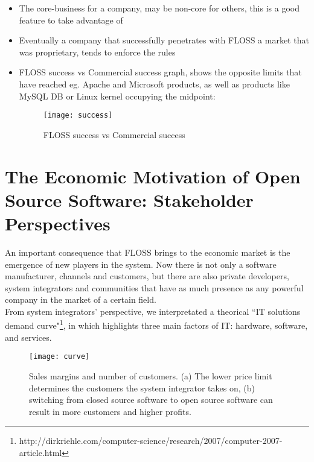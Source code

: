 \begin{itemize}
\item The core-business for a company, may be non-core for others, this is a good feature to take advantage of
\item Eventually a company that successfully penetrates with FLOSS a market that was proprietary, tends to enforce the rules
\item FLOSS success vs Commercial success graph, shows the opposite limits that have reached eg. Apache and Microsoft products, as well as products like MySQL DB or Linux kernel occupying the midpoint:
\begin{figure}[h]
\begin{center}
\texttt{[image: success]}
\caption{FLOSS success vs Commercial success}
\label{fig:success}
\end{center}
\end{figure}
\end{itemize}


\section{The Economic Motivation of Open Source Software: Stakeholder Perspectives}\label{Section 2.2}

An important consequence that FLOSS brings to the economic market is the emergence of new players in the system. Now there is not only a software manufacturer, channels and customers, but there are also private developers, system integrators and communities that have as much presence as any powerful company in the market of a certain field.\\

From system integrators' perspective, we interpretated a theorical \textquotedblleft IT solutions demand curve"\footnote{http://dirkriehle.com/computer-science/research/2007/computer-2007-article.html}, in which highlights three main factors of IT: hardware, software, and services.\\

\begin{figure}[h]
\begin{center}
\texttt{[image: curve]}
\caption[Sales margins and number of customers]
{Sales margins and number of customers. (a) The lower price limit determines the customers the system integrator takes on, (b) switching from closed source software to open source software can result in more customers and higher profits.}
\label{fig:curve}
\end{center}
\end{figure}

